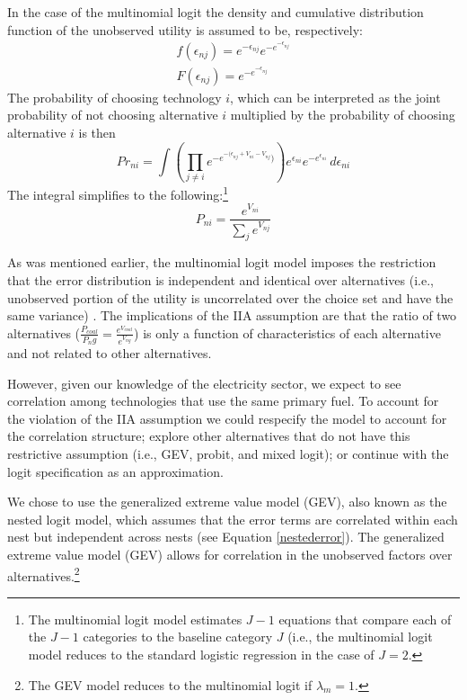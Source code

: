 \documentclass[10pt]{amsart}
\begin{document}
In the case of the multinomial logit the density and cumulative distribution function of the unobserved utility is assumed to be, respectively:
\begin{equation}
\begin{split}
f(\epsilon_{nj}) = e^{-\epsilon_{nj}}e^{-e^{-\epsilon_{nj}}} \\
F(\epsilon_{nj}) = e^{-e^{-\epsilon_{nj}}}
\end{split}
\end{equation}
The probability of choosing technology $i$, which can be interpreted as the joint probability of not choosing alternative $i$ multiplied by the probability of choosing alternative $i$ is then 
\begin{equation}
Pr_{ni} = \int \left(\prod_{j \neq i} e^{-e^{-(\epsilon_{nj} + V_{ni} - V_{nj}})}\right)e^{\epsilon_{ni}}e^{-e^{\epsilon_{ni}}} \,d\epsilon_{ni} 
\end{equation}
The integral simplifies to the following:\footnote{The multinomial logit model estimates $J - 1$ equations that compare each of the $J - 1$ categories to the baseline category $J$ (i.e., the multinomial logit model reduces to the standard logistic regression in the case of $J=2$.} 
\begin{equation}
P_{ni} = \frac{e^{V_{ni}}}{\sum_{j} e^{V_{nj}}}
\end{equation}

As was mentioned earlier, the multinomial logit model imposes the restriction that the error distribution is independent and identical over alternatives (i.e., unobserved portion of the utility is uncorrelated over the choice set and have the same variance) \parencite{wen2001generalized}.
The implications of the IIA assumption are that the ratio of two alternatives ($\frac{P_{coal}}{P_ng} = \frac{e^{V_{coal}}}{e^{V_{ng}}}$) is only a function of characteristics of each alternative and not related to other alternatives.

However, given our knowledge of the electricity sector, we expect to see correlation among technologies that use the same primary fuel. 
To account for the violation of the IIA assumption we could respecify the model to account for the correlation structure; explore other alternatives that do not have this restrictive assumption (i.e., GEV, probit, and mixed logit); or continue with the logit specification as an approximation.

We chose to use the generalized extreme value model (GEV), also known as the nested logit model, which assumes that the error terms are correlated within each nest but independent across nests (see Equation \ref{nestederror}).
The generalized extreme value model (GEV) allows for correlation in the unobserved factors over alternatives.\footnote{The GEV model reduces to the multinomial logit if $\lambda_m = 1$.} 
\end{document}
